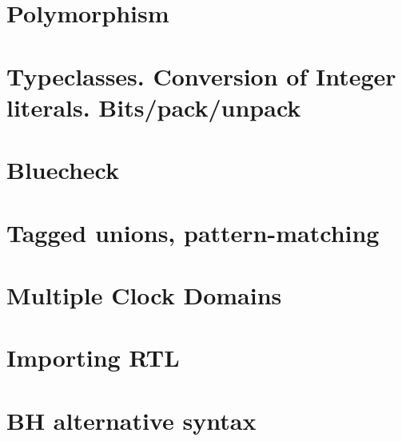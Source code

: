 \section{Polymorphism}


\section{Typeclasses. Conversion of Integer literals. Bits/pack/unpack}


\section{Bluecheck}


\section{Tagged unions, pattern-matching}


\section{Multiple Clock Domains}


\section{Importing RTL}


\section{BH alternative syntax}

